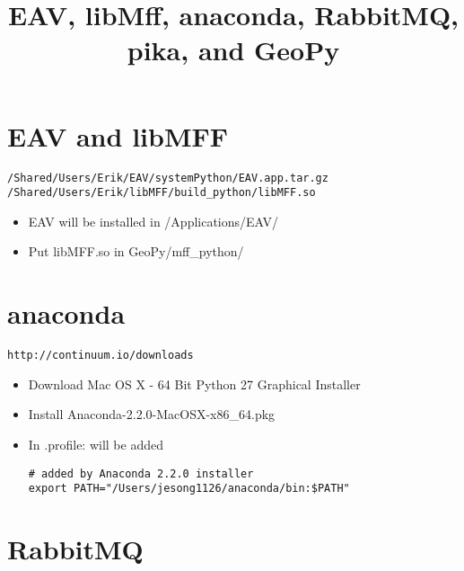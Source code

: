 \documentclass[10pt]{article}
\title{EAV, libMff, anaconda, RabbitMQ, pika, and GeoPy }
\begin{document}
\section{EAV and libMFF}
\begin{verbatim} 
/Shared/Users/Erik/EAV/systemPython/EAV.app.tar.gz  
/Shared/Users/Erik/libMFF/build_python/libMFF.so 
\end{verbatim} 
\begin{itemize}
\item EAV will be installed in /Applications/EAV/ 
\item Put libMFF.so in GeoPy/mff\_python/
\end{itemize}

\section{anaconda}
\begin{verbatim} 
http://continuum.io/downloads
\end{verbatim} 
\begin{itemize}
\item Download Mac OS X - 64 Bit Python 27 Graphical Installer 
\item Install Anaconda-2.2.0-MacOSX-x86\_64.pkg 
\item In .profile: will be added   
\begin{verbatim} 
# added by Anaconda 2.2.0 installer                                             
export PATH="/Users/jesong1126/anaconda/bin:$PATH" 
\end{verbatim} 
\end{itemize}

\section{RabbitMQ} \label{sec:intro} 
\end{document}
